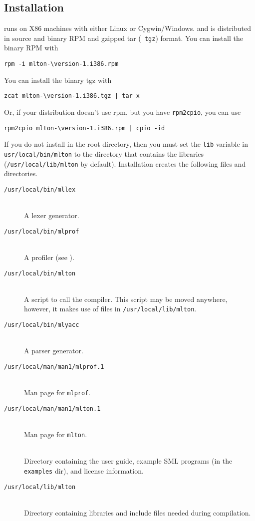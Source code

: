 
\subsection{Installation}

{\mlton} runs on X86 machines with either Linux or Cygwin/Windows.
and is distributed in source and binary RPM and gzipped tar ({\tt
tgz}) format.  You can install the binary RPM with
\begin{verbatim}
rpm -i mlton-\version-1.i386.rpm
\end{verbatim}
You can install the binary tgz with
\begin{verbatim}
zcat mlton-\version-1.i386.tgz | tar x
\end{verbatim}
Or, if your distribution doesn't use rpm, but you have {\tt rpm2cpio},
you can use
\begin{verbatim}
rpm2cpio mlton-\version-1.i386.rpm | cpio -id
\end{verbatim}
If you do not install {\mlton} in the root directory, then you must
set the {\tt lib} variable in {\tt usr/local/bin/mlton} to the
directory that contains the libraries ({\tt /usr/local/lib/mlton} by
default).
Installation creates the following files and directories.

\newcommand{\place}[1]{\item[\tt #1]\hspace{1in}\\}

\begin{description}

\place{/usr/local/bin/mllex}
A lexer generator.

\place{/usr/local/bin/mlprof}
A profiler (see ).

\place{/usr/local/bin/mlton}
A script to call the compiler.
This script may be moved anywhere, however,
it makes use of files in {\tt /usr/local/lib/mlton}.

\place{/usr/local/bin/mlyacc}
A parser generator.

\place{/usr/local/man/man1/mlprof.1}
Man page for {\tt mlprof}.

\place{/usr/local/man/man1/mlton.1}
Man page for {\tt mlton}.

\place{\doc}
Directory containing the user guide, example SML programs (in the {\tt examples}
dir), and license information.

\place{/usr/local/lib/mlton}
Directory containing libraries and include files needed during
compilation.

\end{description}

